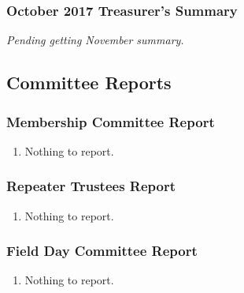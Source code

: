 \documentclass[10pt,letterpaper]{article}
\begin{document}
\subsubsection{October 2017 Treasurer's Summary}
\noindent
\emph{Pending getting November summary.}

\subsection{Committee Reports}

\subsubsection{Membership Committee Report}
\begin{enumerate}
  \item Nothing to report.
\end{enumerate}

\subsubsection{Repeater Trustees Report}
\begin{enumerate}
  \item Nothing to report.
\end{enumerate}

\subsubsection{Field Day Committee Report}
\begin{enumerate}
  \item Nothing to report.
\end{enumerate}
\end{document}

